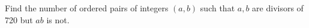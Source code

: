 Find the number of ordered pairs of integers $(a, b)$ such that $a, b$ are divisors of 720 but $ab$ is not.